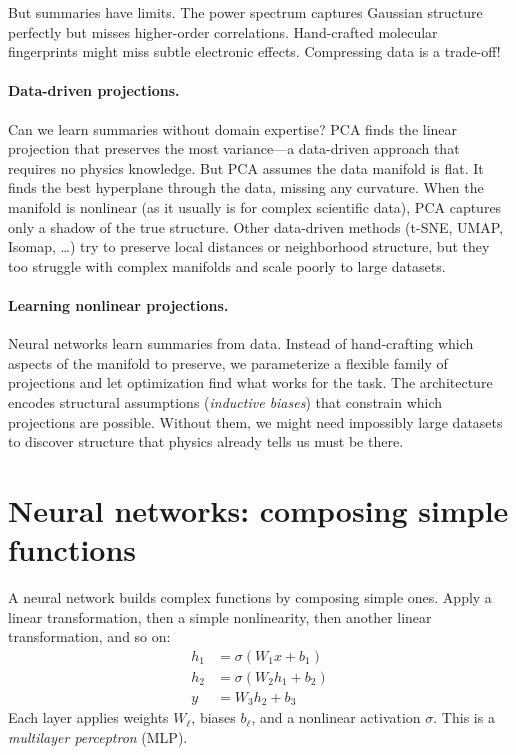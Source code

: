 \documentclass[11pt]{article}
\begin{document}
But summaries have limits. The power spectrum captures Gaussian structure perfectly but misses higher-order correlations. Hand-crafted molecular fingerprints might miss subtle electronic effects. Compressing data is a trade-off!

\paragraph{Data-driven projections.} Can we learn summaries without domain expertise? PCA finds the linear projection that preserves the most variance---a data-driven approach that requires no physics knowledge. But PCA assumes the data manifold is flat. It finds the best hyperplane through the data, missing any curvature. When the manifold is nonlinear (as it usually is for complex scientific data), PCA captures only a shadow of the true structure. Other data-driven methods (t-SNE, UMAP, Isomap, \ldots) try to preserve local distances or neighborhood structure, but they too struggle with complex manifolds and scale poorly to large datasets.

\paragraph{Learning nonlinear projections.} Neural networks learn summaries from data. Instead of hand-crafting which aspects of the manifold to preserve, we parameterize a flexible family of projections and let optimization find what works for the task. The architecture encodes structural assumptions (\emph{inductive biases}) that constrain which projections are possible. Without them, we might need impossibly large datasets to discover structure that physics already tells us must be there.

\section{Neural networks: composing simple functions}

A neural network builds complex functions by composing simple ones. Apply a linear transformation, then a simple nonlinearity, then another linear transformation, and so on:
\begin{align}
h_1 &= \sigma(W_1 x + b_1) \\
h_2 &= \sigma(W_2 h_1 + b_2) \\
y &= W_3 h_2 + b_3
\end{align}
Each layer applies weights $W_\ell$, biases $b_\ell$, and a nonlinear activation $\sigma$. This is a \emph{multilayer perceptron} (MLP).
\end{document}
